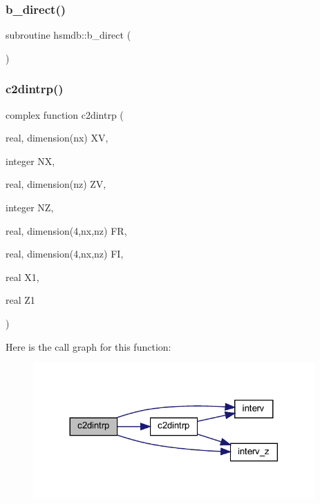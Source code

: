 \subsubsection{\texorpdfstring{b\+\_\+direct()}{b\_direct()}}
{\footnotesize\ttfamily subroutine hsmdb\+::b\+\_\+direct (\begin{DoxyParamCaption}{ }\end{DoxyParamCaption})}

\mbox{\label{Leroi__c_8f90_ab444c66af8ac23d415864bbbd3ff9872}} 
\subsubsection{\texorpdfstring{c2dintrp()}{c2dintrp()}}
{\footnotesize\ttfamily complex function c2dintrp (\begin{DoxyParamCaption}\item[{real, dimension(nx)}]{XV,  }\item[{integer}]{NX,  }\item[{real, dimension(nz)}]{ZV,  }\item[{integer}]{NZ,  }\item[{real, dimension(4,nx,nz)}]{FR,  }\item[{real, dimension(4,nx,nz)}]{FI,  }\item[{real}]{X1,  }\item[{real}]{Z1 }\end{DoxyParamCaption})}

Here is the call graph for this function\+:\nopagebreak
\begin{figure}[H]
\begin{center}
\leavevmode
\includegraphics[width=305pt]{Leroi__c_8f90_ab444c66af8ac23d415864bbbd3ff9872_cgraph}
\end{center}
\end{figure}
\mbox{\label{Leroi__c_8f90_a5a4be24a4461d42dc9be5d5388c4d366}} 
